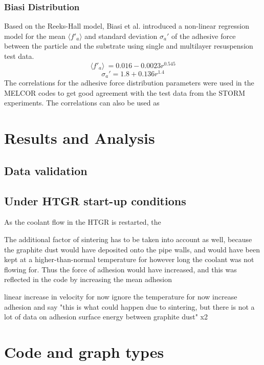 \documentclass{article}
\begin{document}
\subsubsection{Biasi Distribution}

Based on the Reeks-Hall model, Biasi et al. introduced a non-linear regression model for the mean \(\langle{f'_a}\rangle\) and standard deviation \(\sigma_a'\) of the adhesive force between the particle and the substrate using single and multilayer resuspension test data. 
\begin{equation}\label{9}
        \langle{f'_a}\rangle\ = 0.016 - 0.0023 r^{0.545}
\end{equation}
\begin{equation}\label{9}
        \sigma_a' = 1.8 + 0.136 r^{1.4}
\end{equation}
The correlations for the adhesive force distribution parameters were used in the MELCOR codes to get good agreement with the test data from the STORM experiments. The correlations can also be used as 

\section{Results and Analysis}

\subsection{Data validation}

\subsection{Under HTGR start-up conditions}

As the coolant flow in the HTGR is restarted, the 

The additional factor of sintering has to be taken into account as well, because the graphite dust would have deposited onto the pipe walls, and would have been kept at a higher-than-normal temperature for however long the coolant was not flowing for. Thus the force of adhesion would have increased, and this was reflected in the code by increasing the mean adhesion 

linear increase in velocity for now 
ignore the temperature for now 
increase adhesion and say "this is what could happen due to sintering, but there is not a lot of data on adhesion surface energy between graphite dust" x2 

\section{Code and graph types}
\end{document}
